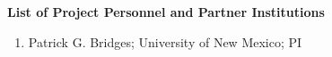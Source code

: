 \documentclass[11pt]{article}
\begin{document}
\begin{center}
{\Large\sc\bf List of Project Personnel and Partner Institutions}
\end{center}

\begin{enumerate}
\item Patrick G. Bridges; University of New Mexico; PI
\end{enumerate}
\end{document}
